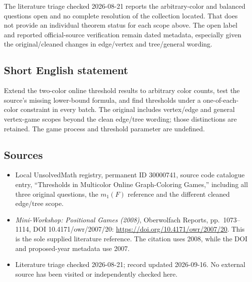 \documentclass[11pt]{article}
\begin{document}
The literature triage checked 2026-08-21 reports the arbitrary-color and balanced questions open and no complete resolution of the collection located. That does not provide an individual theorem status for each scope above. The open label and reported official-source verification remain dated metadata, especially given the original/cleaned changes in edge/vertex and tree/general wording.
\subsection{Short English statement}
Extend the two-color online threshold results to arbitrary color counts, test the source's missing lower-bound formula, and find thresholds under a one-of-each-color constraint in every batch. The original includes vertex/edge and general vertex-game scopes beyond the clean edge/tree wording; those distinctions are retained. The game process and threshold parameter are undefined.
\subsection{Sources}
\begin{itemize}
\item Local UnsolvedMath registry, permanent ID 30000741, source code catalogue entry, ``Thresholds in Multicolor Online Graph-Coloring Games,'' including all three original questions, the \(m_1(F)\) reference and the different cleaned edge/tree scope.
\item \emph{Mini-Workshop: Positional Games (2008)}, Oberwolfach Reports, pp.\ 1073--1114, DOI 10.4171/owr/2007/20: \url{https://doi.org/10.4171/owr/2007/20}. This is the sole supplied literature reference. The citation uses 2008, while the DOI and proposed-year metadata use 2007.
\item Literature triage checked 2026-08-21; record updated 2026-09-16. No external source has been visited or independently checked here.
\end{itemize}
\end{document}
